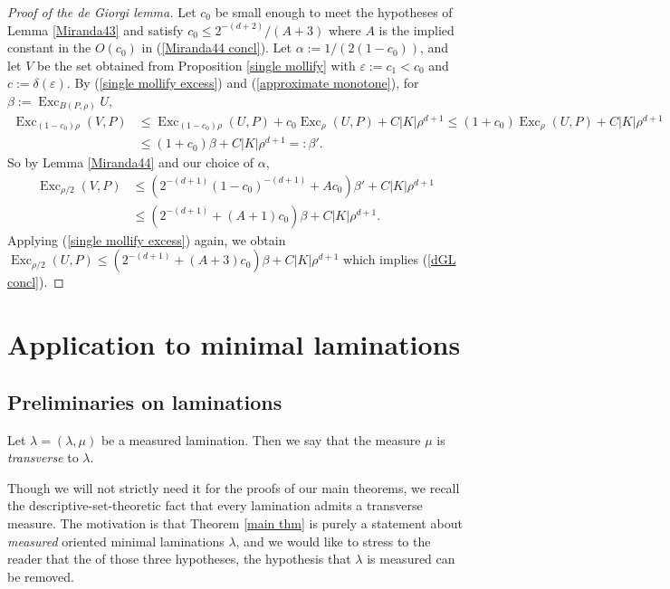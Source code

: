 \documentclass[reqno,10pt]{amsart}
\DeclareMathOperator{\Exc}{Exc}
\newcommand{\dfn}[1]{\emph{#1}\index{#1}}
\theoremstyle{definition}
\numberwithin{equation}{section}
\begin{document}
\begin{proof}[Proof of the de Giorgi lemma]
Let $c_0$ be small enough to meet the hypotheses of Lemma \ref{Miranda43} and satisfy $c_0 \leq 2^{-(d + 2)}/(A + 3)$ where $A$ is the implied constant in the $O(c_0)$ in (\ref{Miranda44 concl}).
Let $\alpha := 1/(2(1 - c_0))$, and let $V$ be the set obtained from Proposition \ref{single mollify} with $\varepsilon := c_1 < c_0$ and $c := \delta(\varepsilon)$.
By (\ref{single mollify excess}) and (\ref{approximate monotone}), for $\beta := \Exc_{B(P, \rho)} U$,
\begin{align*}
\Exc_{(1 - c_0) \rho} (V, P) &\leq \Exc_{(1 - c_0) \rho} (U, P) + c_0 \Exc_\rho (U, P) + C|K| \rho^{d + 1} \leq (1 + c_0) \Exc_\rho (U, P) + C |K| \rho^{d + 1} \\
&\leq (1 + c_0) \beta + C |K| \rho^{d + 1} =: \beta'.
\end{align*}
So by Lemma \ref{Miranda44} and our choice of $\alpha$,
\begin{align*}
\Exc_{\rho/2} (V, P) &\leq (2^{-(d + 1)} (1 - c_0)^{-(d + 1)} + Ac_0) \beta' + C |K| \rho^{d + 1} \\
&\leq (2^{-(d + 1)} + (A + 1) c_0) \beta + C |K| \rho^{d + 1}.
\end{align*}
Applying (\ref{single mollify excess}) again, we obtain $\Exc_{\rho/2} (U, P) \leq (2^{-(d + 1)} + (A + 3) c_0) \beta + C |K| \rho^{d +1}$ which implies (\ref{dGL concl}).
\end{proof}


\section{Application to minimal laminations}\label{GornySec}
\subsection{Preliminaries on laminations}
Let $\lambda = (\lambda, \mu)$ be a measured lamination.
Then we say that the measure $\mu$ is \dfn{transverse} to $\lambda$.

Though we will not strictly need it for the proofs of our main theorems, we recall the descriptive-set-theoretic fact that every lamination admits a transverse measure.
The motivation is that Theorem \ref{main thm} is purely a statement about \emph{measured} oriented minimal laminations $\lambda$, and we would like to stress to the reader that the of those three hypotheses, the hypothesis that $\lambda$ is measured can be removed.
\end{document}
